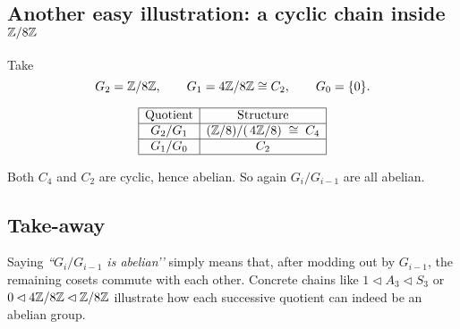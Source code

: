 \documentclass[12pt]{article}
\theoremstyle{definition} %
\theoremstyle{plain} %
\begin{document}
\subsection*{Another easy illustration: a cyclic chain inside \(\Bbb Z/8\Bbb Z\)}

Take
\[
   G_2=\Bbb Z/8\Bbb Z,\qquad
   G_1=4\Bbb Z/8\Bbb Z\cong C_2,\qquad
   G_0=\{0\}.
\]

\[
\begin{array}{|c|c|}
\hline
\text{Quotient} & \text{Structure} \\ \hline
G_2/G_1 & (\Bbb Z/8)/(\,4\Bbb Z/8) \;\cong\; C_4 \\ \hline
G_1/G_0 & C_2 \\ \hline
\end{array}
\]

Both \(C_4\) and \(C_2\) are cyclic, hence abelian.  
So again \(G_i/G_{i-1}\) are all abelian.

\subsection*{Take-away}

Saying \emph{“\(G_i/G_{i-1}\) is abelian’’} simply means that, after
modding out by \(G_{i-1}\), the remaining cosets commute with each
other.  Concrete chains like
\(
   1\lhd A_3\lhd S_3
\)
or
\(
   0\lhd 4\Bbb Z/8\Bbb Z\lhd\Bbb Z/8\Bbb Z
\)
illustrate how each successive quotient can indeed be an abelian group.
\end{document}
